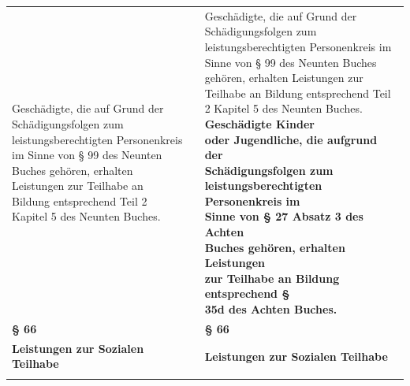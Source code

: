 \documentclass[10pt,a4paper,landscape]{article}
\begin{document}
\begin{longtable}{|L{8.2cm}|L{8.2cm}|L{8.2cm}|}
Geschädigte, die auf Grund der  \newline Schädigungsfolgen zum  \newline leistungsberechtigten Personenkreis im  \newline Sinne von \S{} 99 des Neunten Buches  \newline gehören, erhalten Leistungen zur Teilhabe  \newline an Bildung entsprechend Teil 2 Kapitel 5  \newline des Neunten Buches. &  & Geschädigte, die auf Grund der  \newline Schädigungsfolgen zum  \newline leistungsberechtigten Personenkreis im  \newline Sinne von \S{} 99 des Neunten Buches  \newline gehören, erhalten Leistungen zur Teilhabe  \newline an Bildung entsprechend Teil 2 Kapitel 5  \newline des Neunten Buches. \textbf{\textcolor{diffgreen}{Geschädigte Kinder  \newline oder Jugendliche, die aufgrund der  \newline Schädigungsfolgen zum  \newline leistungsberechtigten Personenkreis im  \newline Sinne von \S{} 27 Absatz 3 des Achten  \newline Buches gehören, erhalten Leistungen  \newline zur Teilhabe an Bildung entsprechend \S{}  \newline 35d des Achten Buches.}} \\
\hhline{|---|}
\textbf{\S{} 66} &  & \textbf{\S{} 66} \\
\hhline{|---|}
\textbf{Leistungen zur Sozialen Teilhabe} &  & \textbf{Leistungen zur Sozialen Teilhabe} \\
\hhline{|---|}

\end{longtable}
\end{document}
